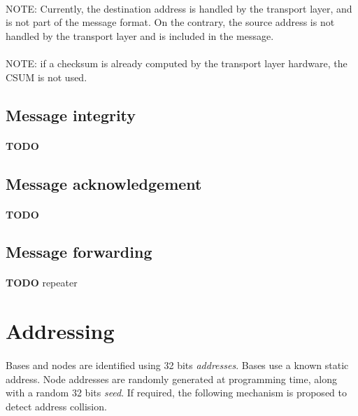 \documentclass[a4paper, 11pt]{article}
\begin{document}
\paragraph{}
NOTE: Currently, the destination address is handled by the transport layer,
and is not part of the message format. On the contrary, the source address
is not handled by the transport layer and is included in the message.

\paragraph{}
NOTE: if a checksum is already computed by the transport layer hardware, the
CSUM is not used.

\subsection{Message integrity}
\paragraph{}
\textbf{TODO}

\subsection{Message acknowledgement}
\paragraph{}
\textbf{TODO}

\subsection{Message forwarding}
\paragraph{}
\textbf{TODO} repeater


\clearpage
\section{Addressing}

\paragraph{}
Bases and nodes are identified using 32 bits \textit{addresses}. Bases use a
known static address. Node addresses are randomly generated at programming time,
along with a random 32 bits \textit{seed}. If required, the following mechanism
is proposed to detect address collision.
\end{document}

